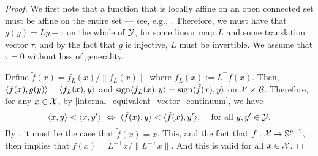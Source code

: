 \documentclass[twoside, 11pt]{article}
\begin{document}
\begin{proof}
We first note that a function that is locally affine on an open connected set must be affine on the entire set --- see, e.g., \cite[Lem 8]{arias2017some}.
Therefore, we must have that $g(y) = L y + \tau$ on the whole of $\mathcal{Y}$, for some linear map $L$ and some translation vector $\tau$, and by the fact that $g$ is injective, $L$ must be invertible. 
We assume that $\tau = 0$ without loss of generality.

Define $\tilde f(x) = f_L(x)/\|f_L(x)\|$ where $f_L(x) := L^{\top} f(x)$. Then, $\langle f(x), g(y)\rangle = \langle f_L(x), y\rangle$ and $\operatorname{sign} \langle f_L(x), y\rangle = \operatorname{sign} \langle\tilde f(x), y\rangle$ on $\mathcal{X} \times \mathcal{B}$. 
Therefore, for any $x\in \mathcal{X}$, by \eqref{internal_equivalent_vector_continuum}, we have
\begin{equation}
\text{$\langle x,y\rangle < \langle x,y'\rangle \ \Leftrightarrow \  \langle\tilde f(x), y\rangle < \langle\tilde f(x), y'\rangle$, \quad for all $y, y' \in \mathcal{Y}$.}
\end{equation}
By , it must be the case that $\tilde f(x) = x$. This, and the fact that $f : \mathcal{X} \to \mathbb{S}^{p-1}$, then implies that $f(x) = L^{-\top} x/\|L^{-\top} x\|$. And this is valid for all $x \in \mathcal{X}$.
\end{proof}
\end{document}
